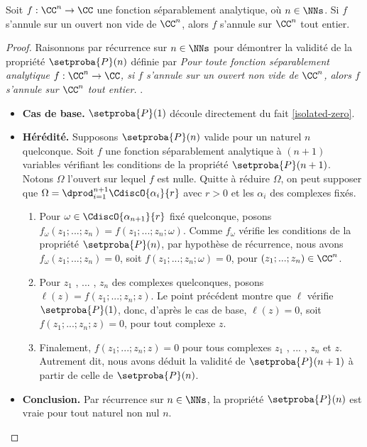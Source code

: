 \begin{fact} \label{multi-isolated-zero}
    Soit $f: \CC^n \rightarrow \CC$ une fonction séparablement analytique, où $n \in \NNs$.
	Si $f$ s'annule sur un ouvert non vide de $\CC^n$, alors $f$ s'annule sur $\CC^n$ tout entier. 
\end{fact}


\begin{proof}
	Raisonnons par récurrence sur $n \in \NNs$ pour démontrer la validité de la propriété $\setproba{P}(n)$ définie par
	\emph{\og 
		Pour toute fonction séparablement analytique $f: \CC^n \rightarrow \CC$,
		si $f$ s'annule sur un ouvert non vide de $\CC^n$,
		alors $f$ s'annule sur $\CC^n$ tout entier. 
	\fg}\kern2pt.
	\begin{itemize}[label=\small\textbullet]
		\item \textbf{Cas de base.}
		$\setproba{P}(1)$ découle directement du fait \ref{isolated-zero}.


		\item \textbf{Hérédité.}
		Supposons $\setproba{P}(n)$ valide pour un naturel $n$ quelconque.
		Soit $f$ une fonction séparablement analytique à $(n + 1)$ variables vérifiant les conditions de la propriété $\setproba{P}(n + 1)$. Notons $\Omega$ l'ouvert sur lequel $f$ est nulle.
		Quitte à réduire $\Omega$, on peut supposer que
		$\Omega = \dprod_{i=1}^{n+1} \CdiscO{\alpha_i}{r}$
		avec $r > 0$ et les $\alpha_i$ des complexes fixés.
		\begin{enumerate}
		    \item Pour $\omega \in \CdiscO{\alpha_{n+1}}{r}$ fixé quelconque,
		    posons $f_\omega(z_1 ; ... ; z_n) = f(z_1 ; ... ; z_n ; \omega)$.
		    Comme $f_\omega$ vérifie les conditions de la propriété $\setproba{P}(n)$, par hypothèse de récurrence, nous avons
		    $f_\omega(z_1 ; ... ; z_n) = 0$, 
		    soit $f(z_1 ; ... ; z_n ; \omega) = 0$,
		    pour $(z_1 ; ... ; z_n) \in \CC^n$.


		    \item Pour $z_1$ , ... , $z_n$ des complexes quelconques,
		    posons $\ell(z) = f(z_1 ; ... ; z_n ; z)$.
		    Le point précédent montre que $\ell$ vérifie $\setproba{P}(1)$,
		    donc, d'après le cas de base,
		    $\ell(z) = 0$,
		    soit $f(z_1 ; ... ; z_n ; z) = 0$,
		    pour tout complexe $z$.


		    \item Finalement, $f(z_1 ; ... ; z_n ; z) = 0$ pour tous complexes $z_1$ , ... , $z_n$ et $z$.
		    Autrement dit, nous avons déduit la validité de $\setproba{P}(n+1)$ à partir de celle de $\setproba{P}(n)$.
		\end{enumerate}
		
		
		\item \textbf{Conclusion.}
		Par récurrence sur $n \in \NNs$, la propriété $\setproba{P}(n)$ est vraie pour tout naturel non nul $n$.
	\end{itemize}

	\null\vspace{-6ex}
\end{proof}